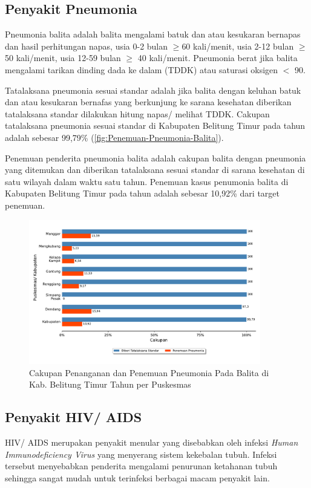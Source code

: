 \subsection{Penyakit Pneumonia}
Pneumonia balita adalah balita mengalami batuk dan atau kesukaran bernapas dan hasil perhitungan napas, usia 0-2 bulan $\geq$60 kali/menit, usia 2-12 bulan $\geq$ 50 kali/menit, usia 12-59 bulan $\geq$ 40 kali/menit. Pneumonia berat jika balita mengalami tarikan dinding dada ke dalam (TDDK) atau saturasi oksigen $<$ 90.\

Tatalaksana pneumonia sesuai standar adalah jika balita dengan keluhan batuk dan atau kesukaran bernafas yang berkunjung ke sarana kesehatan diberikan tatalaksana standar dilakukan hitung napas/ melihat TDDK. Cakupan tatalaksana pneumonia sesuai standar di Kabupaten Belitung Timur pada tahun \tP adalah sebesar 99,79\% (\autoref{fig:Penemuan-Pneumonia-Balita}).

Penemuan penderita pneumonia balita adalah cakupan balita dengan pneumonia yang ditemukan dan diberikan tatalaksana sesuai standar di sarana kesehatan di satu wilayah dalam waktu satu tahun. Penemuan kasus penumonia balita di Kabupaten Belitung Timur pada tahun \tP adalah sebesar 10,92\% dari target penemuan.

\begin{figure}[H]
    \centering
    \includegraphics[width=0.9\textwidth]{bab_06/bab_06_02_pneumoniaBalita}
    \caption{Cakupan Penanganan dan Penemuan Pneumonia Pada Balita di Kab. Belitung Timur Tahun \tP per Puskesmas}
    \label{fig:Penemuan-Pneumonia-Balita}
\end{figure}


\subsection{Penyakit HIV/ AIDS}
HIV/ AIDS merupakan penyakit menular yang disebabkan oleh infeksi
\emph{Human Immunodeficiency Virus} yang menyerang sistem kekebalan tubuh.
Infeksi tersebut menyebabkan penderita mengalami penurunan ketahanan
tubuh sehingga sangat mudah untuk terinfeksi berbagai macam penyakit
lain.

